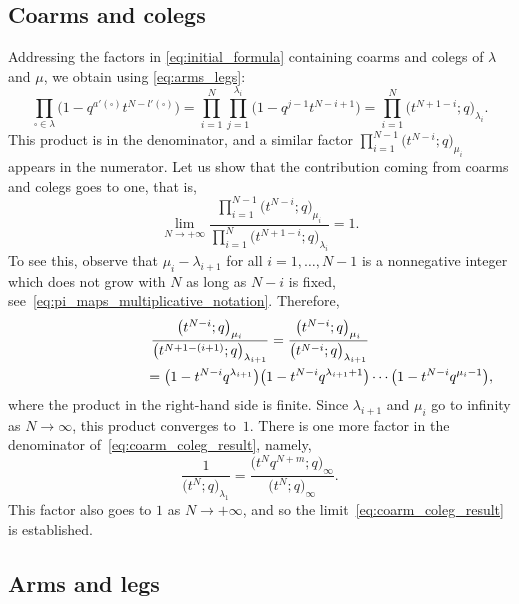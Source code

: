 \documentclass[pdftex]{sigma}
\numberwithin{equation}{section}
\begin{document}
\subsection{Coarms and colegs}
Addressing the factors in
\eqref{eq:initial_formula}
containing coarms and colegs of $\lambda$ and $\mu$,
we obtain using \eqref{eq:arms_legs}:
\begin{equation*}
	\prod_{\square\in \lambda}\big(1-q^{a'(\square)}t^{N-l'(\square)}\big)
	=
	\prod_{i=1}^{N}
	\prod_{j=1}^{\lambda_i}
	\big(1-q^{j-1}t^{N-i+1}\big)
	=
	\prod_{i=1}^{N}
	\big(t^{N+1-i};q\big)_{\lambda_i}.
\end{equation*}
This product is in the denominator, and a similar
factor
$\prod_{i=1}^{N-1}
\big(t^{N-i};q\big)_{\mu_i}$
appears in the numerator.
Let us show that the contribution coming from
coarms and colegs goes to one, that is,%
\begin{equation}
	\label{eq:coarm_coleg_result}
	\lim_{N\to+\infty}
	\frac{\prod_{i=1}^{N-1}
	\big(t^{N-i};q\big)_{\mu_i}}
	{\prod_{i=1}^{N}
	\big(t^{N+1-i};q\big)_{\lambda_i}}=1.
\end{equation}
To see this, observe that
$\mu_{i}-\lambda_{i+1}$ for all $i=1,\dots,N-1 $ is a nonnegative integer
which does not grow with $N$ as long as $N-i$ is fixed,
see~\eqref{eq:pi_maps_multiplicative_notation}. Therefore,
\begin{gather*}
	\frac{\big(t^{N-i};q\big)_{\mu_i}}{\big(t^{N+1-(i+1)};q\big)_{\lambda_{i+1}}}=
	\frac{\big(t^{N-i};q\big)_{\mu_i}}{\big(t^{N-i};q\big)_{\lambda_{i+1}}}\\
\hphantom{\frac{\big(t^{N-i};q\big)_{\mu_i}}{\big(t^{N+1-(i+1)};q\big)_{\lambda_{i+1}}}}{}
=
	\big(1-t^{N-i}q^{\lambda_{i+1}}\big)\big(1-t^{N-i}q^{\lambda_{i+1}+1}\big)\cdots\big(1-t^{N-i}q^{\mu_i-1}\big) ,
\end{gather*}
where the product in the right-hand side is finite. Since $\lambda_{i+1}$ and $\mu_i$ go to infinity
as $N\to\infty$, this product converges to~$1$.
There is one more factor in the denominator of~\eqref{eq:coarm_coleg_result},
namely,
\begin{equation*}
	\frac{1}{\big(t^N;q\big)_{\lambda_1}}=
	\frac{\big(t^Nq^{N+m};q\big)_\infty}{\big(t^N;q\big)_\infty}.
\end{equation*}
This factor also goes to $1$ as $N\to+\infty$,
and so the limit~\eqref{eq:coarm_coleg_result} is established.

\subsection{Arms and legs}
\end{document}
